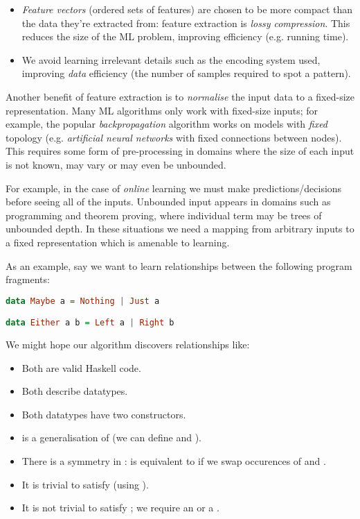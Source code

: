 \begin{itemize}
  \item \emph{Feature vectors} (ordered sets of features) are chosen to be more compact than the data they're extracted from: feature extraction is \emph{lossy compression}. This reduces the size of the ML problem, improving efficiency (e.g. running time).
  \item We avoid learning irrelevant details such as the encoding system used, improving \emph{data} efficiency (the number of samples required to spot a pattern).
\end{itemize}

Another benefit of feature extraction is to \emph{normalise} the input data to a fixed-size representation. Many ML algorithms only work with fixed-size inputs; for example, the popular \emph{backpropagation} \citep{Russell:2003:AIM:773294} algorithm works on models with \emph{fixed} topology (e.g. \emph{artificial neural networks} with fixed connections between nodes). This requires some form of pre-processing in domains where the size of each input is not known, may vary or may even be unbounded.

For example, in the case of \emph{online} learning we must make predictions/decisions before seeing all of the inputs. Unbounded input appears in domains such as programming and theorem proving, where individual term may be trees of unbounded depth. In these situations we need a mapping from arbitrary inputs to a fixed representation which is amenable to learning.

As an example, say we want to learn relationships between the following program fragments:

\begin{lstlisting}[language=Haskell, xleftmargin=.2\textwidth, xrightmargin=.2\textwidth]
data Maybe a = Nothing | Just a

data Either a b = Left a | Right b
\end{lstlisting}

We might hope our algorithm discovers relationships like:

\begin{itemize}
  \item Both are valid Haskell code.
  \item Both describe datatypes.
  \item Both datatypes have two constructors.
  \item {} is a generalisation of  (we can define  and ).
  \item There is a symmetry in :  is equivalent to  if we swap occurences of  and .
  \item It is trivial to satisfy  (using ).
  \item It is not trivial to satisfy ; we require an  or a .
\end{itemize}

